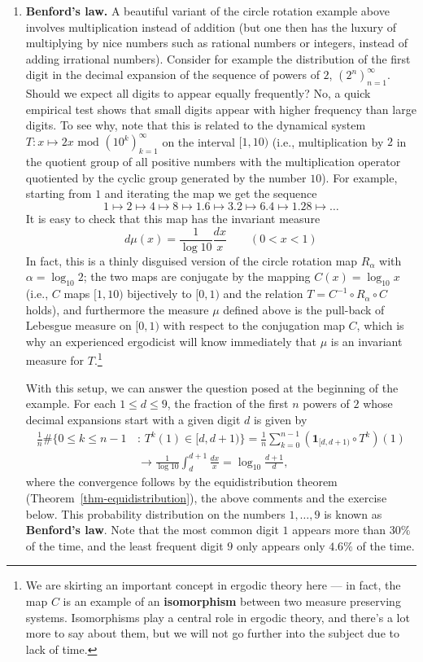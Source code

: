 \documentclass[12pt]{article}
\newcommand{\ind}{\textbf{1}}
\theoremstyle{example}
\begin{document}
\begin{enumerate}
\item \textbf{Benford's law.} A beautiful variant of the circle rotation example above involves multiplication instead of addition (but one then has the luxury of multiplying by nice numbers such as rational numbers or integers, instead of adding irrational numbers). Consider for example the distribution of the first digit in the decimal expansion of the sequence of powers of $2$, $(2^n)_{n=1}^\infty$. Should we expect all digits to appear equally frequently? No, a quick empirical test shows that small digits appear with higher frequency than large digits. To see why, note that this is related to the dynamical system $T:x\mapsto 2x \textrm{ mod } (10^k)_{k=1}^\infty $ on the interval $[1,10)$ (i.e., multiplication by $2$ in the quotient group of all positive numbers with the multiplication operator quotiented by the cyclic group generated by the number $10$). For example, starting from $1$ and iterating the map we get the sequence
$$ 1 \mapsto 2 \mapsto 4 \mapsto 8 \mapsto 1.6 \mapsto 3.2 \mapsto 6.4 \mapsto 1.28 \mapsto \ldots $$
It is easy to check that this map has the invariant measure
$$ d\mu(x) = \frac{1}{\log 10} \frac{dx}{x} \qquad (0<x<1) $$
In fact, this is a thinly disguised version of the circle rotation map $R_\alpha$ with $\alpha=\log_{10} 2$; the two maps are conjugate by the mapping $C(x) = \log_{10} x$ (i.e., $C$ maps $[1,10)$ bijectively to $[0,1)$ and the relation $T = C^{-1} \circ R_\alpha\circ C$ holds), and furthermore the measure $\mu$ defined above is the pull-back of Lebesgue measure on $[0,1)$ with respect to the conjugation map $C$, which is why an experienced ergodicist will know immediately that $\mu$ is an invariant measure for $T$.\footnote{We are skirting an important concept in ergodic theory here --- in fact, the map $C$ is an example of an \textbf{isomorphism} between two measure preserving systems. Isomorphisms play a central role in ergodic theory, and there's a lot more to say about them, but we will not go further into the subject due to lack of time.}

With this setup, we can answer the question posed at the beginning of the example. For each $1\le d\le 9$, the fraction of the first $n$ powers of $2$ whose decimal expansions start with a given digit $d$ is given by
\begin{align*}
\frac{1}{n} \#\{ 0\le k\le n-1\,&:\, T^k(1) \in [d,d+1) \} = 
\frac{1}{n} \sum_{k=0}^{n-1} \left(\ind_{[d,d+1)}\circ T^k\right)(1) \\ &\to \frac{1}{\log 10}\int_d^{d+1}\frac{dx}{x}
= \log_{10}\frac{d+1}{d},
\end{align*}
where the convergence follows by the equidistribution theorem (Theorem~\ref{thm-equidistribution}), the above comments and the exercise below. This probability distribution on the numbers $1,\ldots,9$ is known as \textbf{Benford's law}. Note that the most common digit $1$ appears more than $30\%$ of the time, and the least frequent digit $9$ only appears only $4.6\%$ of the time.


\end{enumerate}
\end{document}
